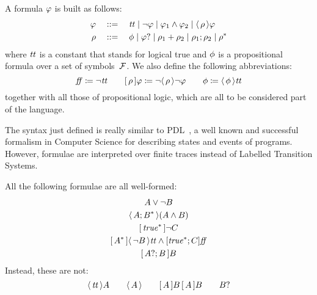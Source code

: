 \begin{definition}
	A \ldl{} formula $\varphi$ is built as follows:
	\begin{equation}
	\begin{aligned}
		\varphi \quad &::= \quad \text{\textit{tt}} \mid \neg \varphi \mid \varphi_1 \land
			\varphi_2 \mid \langle\, {\rho} \,\rangle \varphi \\
		\rho \quad &::= \quad \phi \mid \varphi? \mid \rho_1 +
			\rho_2 \mid \rho_1; \rho_2 \mid \rho^* \\
	\end{aligned}
	\label{eq:ldl-syntax}
	\end{equation}
	where $\text{\textit{tt}}$ is a constant that stands for logical true and $\phi$
	is a propositional formula over a set of symbols~$\mathcal{F}$. We also define
	the following abbreviations:
	\[
		\text{\textit{ff}} \coloneqq \neg \text{\textit{tt}} \qquad
		[\, {\rho} \,]\varphi \coloneqq \neg \langle\, {\rho} \,\rangle\neg \varphi
		\qquad \phi \coloneqq \langle\, {\phi} \,\rangle \text{\textit{tt}}
	\]
	together with all those of propositional logic, which are all to be
	considered part of the language.
	\label{def:ldlf-syntax}
\end{definition}

The syntax just defined is really similar to PDL~\cite{bib:pdl}, a well known
and successful formalism in Computer Science for describing states and events
of programs. However, \ldl{} formulae are interpreted over finite traces
instead of Labelled Transition Systems.

\begin{example}
	All the following formulae are all well-formed:
	\begin{gather*}
		A \lor \lnot B \\
		\ldiamond{A; B^*} (A \land B) \\
		\lbox{\true^*} \lnot C \\
		\lbox{A^*}\ldiamond{\lnot B}\ltt \land [\true^*; C]\lff \\
		\lbox{A?; B}B
	\end{gather*}
	Instead, these are not:
	\[
		\langle\, {\text{\textit{tt}}} \,\rangle A \qquad \langle\, {A} \,\rangle \qquad [\, {A} \,] B \, [\, {A} \,] B
		\qquad B?
	\]
\end{example}

